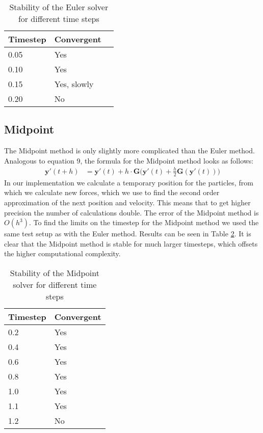 \documentclass[a4paper,twoside,11pt,twocolumn]{article}
\begin{document}
\begin{table}[h]
	\caption{Stability of the Euler solver for different time steps}
	\label{Euler}
	\begin{tabular}{|l|l|l|}
		\hline
		\textbf{Timestep} & \textbf{Convergent} \\ \hline
		0.05              & Yes                 \\ \hline
		0.10              & Yes                 \\ \hline
		0.15              & Yes, slowly         \\ \hline
		0.20              & No                  \\ \hline
	\end{tabular}
\end{table}

\subsection{Midpoint}
The Midpoint method is only slightly more complicated than the Euler method. Analogous to equation 9, the formula for the Midpoint method looks as follows:
\begin{align}
	\mathbf{y}'(t+h) &= \mathbf{y}'(t) + h\cdot \mathbf{G}\biggl(\mathbf{y}'(t)+\frac{h}{2}\mathbf{G}(\mathbf{y}'(t))\biggr)
\end{align}
In our implementation we calculate a temporary position for the particles, from which we calculate new forces, which we use to find the second order approximation of the next position and velocity. This means that to get higher precision the number of calculations double. The error of the Midpoint method is $O(h^3)$.
To find the limits on the timestep for the Midpoint method we used the same test setup as with the Euler method. Results can be seen in Table \ref{Midpoint}. It is clear that the Midpoint method is stable for much larger timesteps, which offsets the higher computational complexity.
\begin{table}[h]
	\caption{Stability of the Midpoint solver for different time steps}
	\label{Midpoint}
	\begin{tabular}{|l|l|}
		\hline
		\textbf{Timestep} & \textbf{Convergent} \\ \hline
		0.2               & Yes                 \\ \hline
		0.4               & Yes                 \\ \hline
		0.6               & Yes                 \\ \hline
		0.8               & Yes                 \\ \hline
		1.0               & Yes                 \\ \hline
		1.1               & Yes                 \\ \hline
		1.2               & No                  \\ \hline
	\end{tabular}
\end{table}
\end{document}
